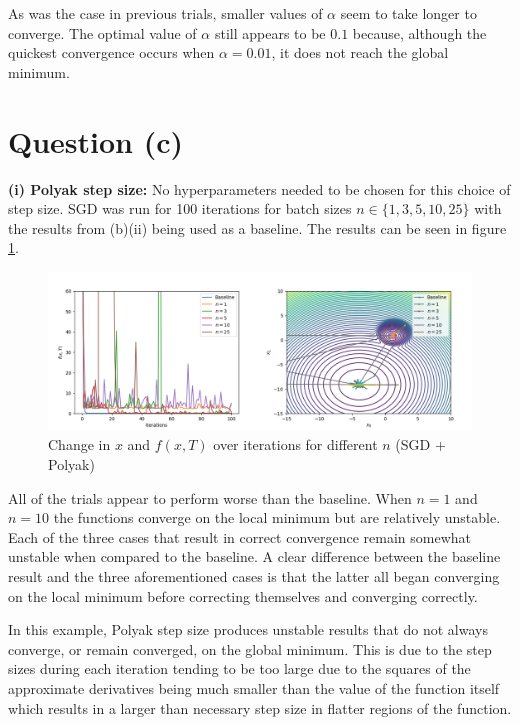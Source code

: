 \documentclass[12pt]{article}
\begin{document}
As was the case in previous trials, smaller values of $\alpha$ seem to take longer to converge. The optimal value of $\alpha$ still appears to be $0.1$ because, although the quickest convergence occurs when $\alpha = 0.01$, it does not reach the global minimum.

\section*{Question (c)}

\noindent \textbf{(i) Polyak step size:} No hyperparameters needed to be chosen for this choice of step size. SGD was run for 100 iterations for batch sizes $n \in \{1, 3, 5, 10, 25\}$ with the results from (b)(ii) being used as a baseline. The results can be seen in figure \ref{fig:c_i}.

\begin{figure}[h]
    \hspace*{-0.45in}
    \includegraphics[scale=1.75]{figs/c/c_i.png}
    \caption{Change in $x$ and $f(x, T)$ over iterations for different $n$ (SGD + Polyak)}
    \label{fig:c_i}
\end{figure}

All of the trials appear to perform worse than the baseline. When $n=1$ and $n=10$ the functions converge on the local minimum but are relatively unstable. Each of the three cases that result in correct convergence remain somewhat unstable when compared to the baseline. A clear difference between the baseline result and the three aforementioned cases is that the latter all began converging on the local minimum before correcting themselves and converging correctly.

In this example, Polyak step size produces unstable results that do not always converge, or remain converged, on the global minimum. This is due to the step sizes during each iteration tending to be too large due to the squares of the approximate derivatives being much smaller than the value of the function itself which results in a larger than necessary step size in flatter regions of the function.
\end{document}
